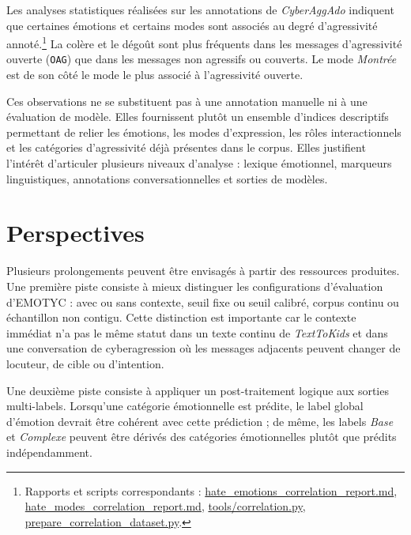Les analyses statistiques réalisées sur les annotations de \textit{CyberAggAdo} indiquent que certaines émotions et certains modes sont associés au degré d'agressivité annoté.\footnote{Rapports et scripts correspondants : \href{https://github.com/GwenTsang/ExpressionEmotionnelle/blob/main/results/hate_emotions_correlation_report.md}{hate\_emotions\_correlation\_report.md}, \href{https://github.com/GwenTsang/ExpressionEmotionnelle/blob/main/results/hate_modes_correlation_report.md}{hate\_modes\_correlation\_report.md}, \href{https://github.com/GwenTsang/ExpressionEmotionnelle/blob/main/tools/correlation.py}{tools/correlation.py}, \href{https://github.com/GwenTsang/ExpressionEmotionnelle/blob/main/tools/prepare_correlation_dataset.py}{prepare\_correlation\_dataset.py}.} La colère et le dégoût sont plus fréquents dans les messages d'agressivité ouverte (\texttt{OAG}) que dans les messages non agressifs ou couverts. Le mode \textit{Montrée} est de son côté le mode le plus associé à l'agressivité ouverte.

Ces observations ne se substituent pas à une annotation manuelle ni à une évaluation de modèle. Elles fournissent plutôt un ensemble d'indices descriptifs permettant de relier les émotions, les modes d'expression, les rôles interactionnels et les catégories d'agressivité déjà présentes dans le corpus. Elles justifient l'intérêt d'articuler plusieurs niveaux d'analyse : lexique émotionnel, marqueurs linguistiques, annotations conversationnelles et sorties de modèles.


\section*{Perspectives}

Plusieurs prolongements peuvent être envisagés à partir des ressources produites. Une première piste consiste à mieux distinguer les configurations d'évaluation d'EMOTYC : avec ou sans contexte, seuil fixe ou seuil calibré, corpus continu ou échantillon non contigu. Cette distinction est importante car le contexte immédiat n'a pas le même statut dans un texte continu de \textit{TextToKids} et dans une conversation de cyberagression où les messages adjacents peuvent changer de locuteur, de cible ou d'intention.

Une deuxième piste consiste à appliquer un post-traitement logique aux sorties multi-labels. Lorsqu'une catégorie émotionnelle est prédite, le label global d'émotion devrait être cohérent avec cette prédiction ; de même, les labels \textit{Base} et \textit{Complexe} peuvent être dérivés des catégories émotionnelles plutôt que prédits indépendamment.

